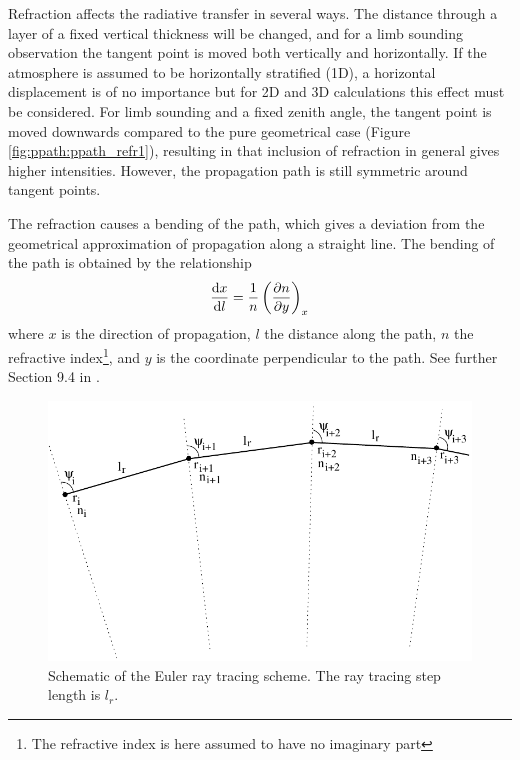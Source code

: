 Refraction affects the radiative transfer in several ways. The
distance through a layer of a fixed vertical thickness will be
changed, and for a limb sounding observation the tangent point is
moved both vertically and horizontally. If the atmosphere is assumed
to be horizontally stratified (1D), a horizontal displacement is of no
importance but for 2D and 3D calculations this effect must be
considered. For limb sounding and a fixed zenith angle, the tangent
point is moved downwards compared to the pure geometrical case
(Figure \ref{fig:ppath:ppath_refr1}), resulting in that inclusion of
refraction in general gives higher intensities. However, the
propagation path is still symmetric around tangent points.

The refraction causes a bending of the path, which gives a deviation
from the geometrical approximation of propagation along a straight
line. The bending of the path is obtained by the relationship
\begin{equation}
  \frac{\mathrm{d} x}{\mathrm{d} l} = \frac{1}{n} \left( \frac{\partial n}{\partial y} \right)_x
  \label{eq:ppath:refrbend}
\end{equation}
where $x$ is the direction of propagation, $l$ the distance along the
path, $n$ the refractive index\footnote{The refractive index is here
  assumed to have no imaginary part}, and $y$ is the coordinate
perpendicular to the path. See further Section 9.4 in
\citet{rodgers:00}.

\begin{figure}[tb!]
 \begin{center}
  \includegraphics*{euler}
  \caption{Schematic of the Euler ray tracing scheme. The ray tracing step 
    length is $l_r$. }
  \label{fig:ppath:euler}  
 \end{center}
\end{figure}

